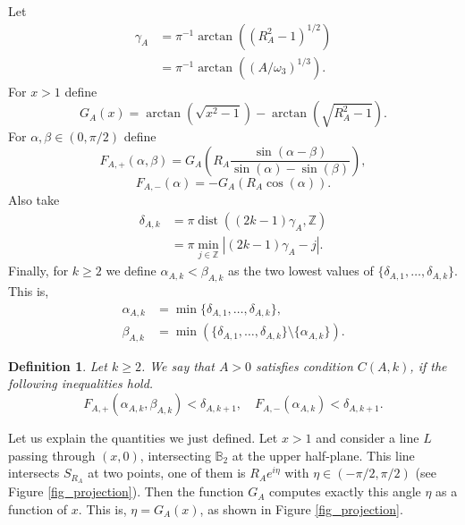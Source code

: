 \documentclass{amsart}
\def \B{\mathbb B}
\def \Z{\mathbb Z}
\newcommand \dist {\operatorname{dist}}
\newtheorem{definition}[theorem]{Definition}
\begin{document}
Let
\begin{align}
\gamma_A
	&= \pi^{-1} \arctan((R_A^2-1)^{1/2}) \label{eq_def_gamma} \\
	&= \pi^{-1} \arctan((A/\omega_3)^{1/3}).
\end{align}
For $x > 1$ define
\[G_A(x) = \arctan(\sqrt{x^2-1}) - \arctan(\sqrt{R_A^2-1}).\]
For $\alpha, \beta \in (0,\pi/2)$ define
\[F_{A,+}(\alpha,\beta) = G_A \left( R_A \frac{\sin(\alpha - \beta)}{\sin(\alpha) - \sin(\beta)} \right),\]
\[F_{A,-}(\alpha) = -G_A(R_A \cos(\alpha)).\]
Also take 
\begin{align}
	\delta_{A,k}
	&= \pi \dist((2k-1) \gamma_A, \Z) \\
	&= \pi \min_{j \in \Z} |(2k-1) \gamma_A - j|.
\end{align}
Finally, for $k \geq 2$ we define $\alpha_{A,k} < \beta_{A,k}$ as the two lowest values of $\{ \delta_{A,1}, \ldots, \delta_{A,k} \}$. This is,
\begin{align}
	\label{eq_def_alphabeta}
	\alpha_{A,k} &= \min\{ \delta_{A,1}, \ldots, \delta_{A,k} \},\\
	\beta_{A,k} &= \min(\{ \delta_{A,1}, \ldots, \delta_{A,k} \} \setminus \{\alpha_{A,k} \}).
\end{align}

\begin{definition}
	\label{def_conditionC}
	Let $k \geq 2$. We say that $A>0$ satisfies condition $C(A,k)$, if the following inequalities hold.
	\begin{equation}
		\label{eq_verify}
		F_{A,+}(\alpha_{A,k}, \beta_{A,k}) < \delta_{A, k+1}, \quad F_{A,-}(\alpha_{A,k}) < \delta_{A, k+1}.
	\end{equation}
\end{definition}

Let us explain the quantities we just defined.
Let $x>1$ and consider a line $L$ passing through $(x,0)$, intersecting $\B_2$ at the upper half-plane.
This line intersects $S_{R_A}$ at two points, one of them is $R_A e^{i \eta}$ with $\eta \in (-\pi/2, \pi/2)$ (see Figure \ref{fig_projection}). Then the function $G_A$ computes exactly this angle $\eta$ as a function of $x$. This is, $\eta = G_A(x)$, as shown in Figure \ref{fig_projection}.
\end{document}
